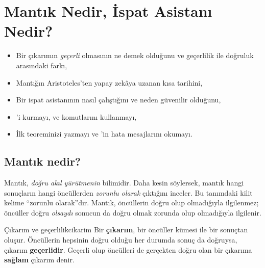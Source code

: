\chapter{Mantık Nedir, İspat Asistanı Nedir?}\label{bol:giris}

\begin{bolumhedefleri}
\begin{itemize}
  \item Bir çıkarımın \emph{geçerli} olmasının ne demek olduğunu ve
        geçerlilik ile doğruluk arasındaki farkı,
  \item Mantığın Aristoteles'ten yapay zekâya uzanan kısa tarihini,
  \item Bir ispat asistanının nasıl çalıştığını ve neden güvenilir olduğunu,
  \item \Lean{}'i kurmayı, \lc{\textcolor{leancmd}{\bfseries\#check}} ve
        \lc{\textcolor{leancmd}{\bfseries\#eval}} komutlarını kullanmayı,
  \item İlk teoreminizi yazmayı ve \Lean{}'in hata mesajlarını okumayı.
\end{itemize}
\end{bolumhedefleri}

\section{Mantık nedir?}\label{sec:mantik-nedir}

Mantık, \emph{doğru akıl yürütmenin} bilimidir. Daha kesin söylersek, mantık
hangi sonuçların hangi öncüllerden \emph{zorunlu olarak} çıktığını inceler.
Bu tanımdaki kilit kelime ``zorunlu olarak''dır. Mantık, öncüllerin doğru
olup olmadığıyla ilgilenmez; öncüller doğru \emph{olsaydı} sonucun da doğru
olmak zorunda olup olmadığıyla ilgilenir.

\begin{tanim}{Çıkarım ve geçerlilik}{cikarim}
Bir \textbf{çıkarım}, bir öncüller kümesi ile bir sonuçtan oluşur.
Öncüllerin hepsinin doğru olduğu her durumda sonuç da doğruysa,
çıkarım \textbf{geçerlidir}. Geçerli olup öncülleri de gerçekten doğru
olan bir çıkarıma \textbf{sağlam} çıkarım denir.
\end{tanim}

